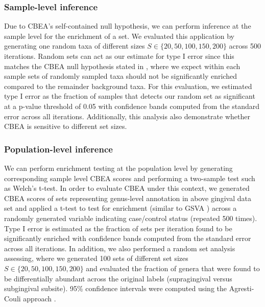 \documentclass[10pt,letterpaper]{article}
\begin{document}
\subsubsection*{Sample-level inference} 
Due to CBEA's self-contained null hypothesis, we can perform inference at the sample level for the enrichment of a set. We evaluated this application by generating one random taxa of different sizes $S \in \{20, 50, 100, 150, 200\}$ across 500 iterations. Random sets can act as our estimate for type I error since this matches the CBEA null hypothesis stated in , where we expect within each sample sets of randomly sampled taxa should not be significantly enriched compared to the remainder background taxa. For this evaluation, we estimated type I error as the fraction of samples that detects our random set as significant at a p-value threshold of 0.05 with confidence bands computed from the standard error across all iterations.  Additionally, this analysis also demonstrate whether CBEA is sensitive to different set sizes.  

\subsubsection*{Population-level inference} 
We can perform enrichment testing at the population level by generating corresponding sample level CBEA scores and performing a two-sample test such as Welch's t-test. In order to evaluate CBEA under this context, we generated CBEA scores of sets representing genus-level annotation in above gingival data set \cite{consortium2012, proctor2019} and applied a t-test to test for enrichment (similar to GSVA \cite{hanzelmann2013}) across a randomly generated variable indicating case/control status (repeated 500 times). Type I error is estimated as the fraction of sets per iteration found to be significantly enriched with confidence bands computed from the standard error across all iterations. In addition, we also performed a random set analysis assessing, where we generated 100 sets of different set sizes $S \in \{20, 50, 100, 150, 200\}$ and evaluated the fraction of genera that were found to be differentially abundant across the original labels (supragingival versus subgingival subsite). 95\% confidence intervals were computed using the Agresti-Couli approach \cite{agresti1998}.  
\end{document}
